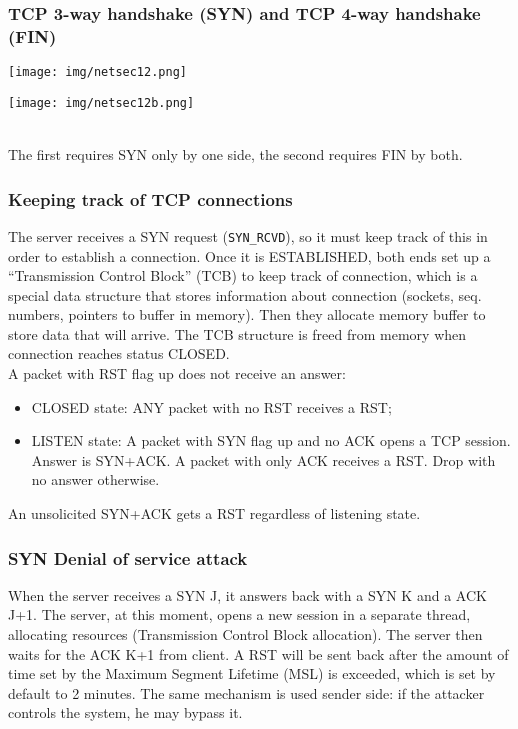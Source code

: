 \documentclass[a4paper, 10pt, titlepage]{article}
\begin{document}
\subsubsection*{TCP 3-way handshake (SYN) and TCP 4-way handshake (FIN)}
\begin{minipage}{0.45\textwidth}
	\begin{center}
		\texttt{[image: img/netsec12.png]}
	\end{center}
\end{minipage}
\hfill
\begin{minipage}{0.45\textwidth}
	\begin{center}
		\texttt{[image: img/netsec12b.png]}
	\end{center}
\end{minipage} \medskip\\
The first requires SYN only by one side, the second requires FIN by both.

\subsubsection*{Keeping track of TCP connections}
The server receives a SYN request (\lstinline|SYN_RCVD|), so it must keep track of this in order to establish a connection. Once it is ESTABLISHED, both ends set up a “Transmission Control Block” (TCB) to keep track of connection, which is a special data structure that stores information about connection (sockets, seq. numbers, pointers to buffer in memory). Then they allocate memory buffer to store data that will arrive. The TCB structure is freed from memory when connection reaches status CLOSED.\medskip \\
A packet with RST flag up does not receive an answer:
\begin{itemize}
\item CLOSED state: ANY packet with no RST receives a RST;
\item LISTEN state: A packet with SYN flag up and no ACK opens a TCP
session. Answer is SYN+ACK. A packet with only ACK receives a RST. Drop with no answer otherwise.
\end{itemize}
An unsolicited SYN+ACK gets a RST regardless of listening state.

\subsubsection{SYN Denial of service attack}
When the server receives a SYN J, it answers back with a SYN K and a ACK J+1. The server, at this moment, opens a new session in a separate thread, allocating resources (Transmission Control Block allocation). The server then waits for the ACK K+1 from client. A RST will be sent back after the amount of time set by the Maximum Segment Lifetime (MSL) is exceeded, which is set by default to 2 minutes. The same mechanism is used sender side: if the attacker controls the system, he may bypass it.
\end{document}
